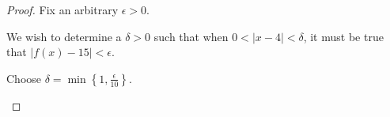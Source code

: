 \begin{enumerate}
\begin{proof} %

Fix an arbitrary $\epsilon > 0$.%

We wish to determine a $\delta >0$ such that when $0 < |x - 4| < \delta$, it must be true that $|f(x) - 15| < \epsilon$.

\begin{multicols}{2} %
Choose $\displaystyle{\delta = \min\left\{1, \frac{\epsilon}{10}\right\}}$. %
%
%
%
%


\end{multicols}
\end{proof}
\end{enumerate}
